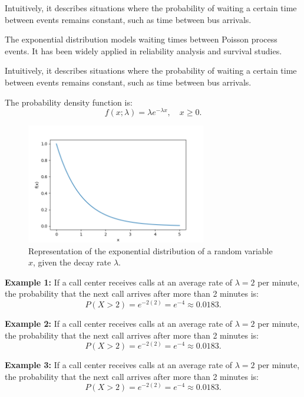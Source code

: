 \documentclass{book}
\begin{document}
Intuitively, it describes situations where the probability of waiting a certain time between events remains constant, such as time between bus arrivals.

The exponential distribution models waiting times between Poisson process events. It has been widely applied in reliability analysis and survival studies.

Intuitively, it describes situations where the probability of waiting a certain time between events remains constant, such as time between bus arrivals.

The probability density function is:
\begin{equation}
    f(x; \lambda) = \lambda e^{-\lambda x}, \quad x \geq 0.
\end{equation}

\begin{figure}[ht]
    \centering
    \includegraphics[width=0.7\textwidth]{figures/chapter2/exponential.png}
    \caption{Representation of the exponential distribution of a random variable $x$, given the decay rate $\lambda$.}
    \label{fig:random}
\end{figure}

\textbf{Example 1:} If a call center receives calls at an average rate of $\lambda = 2$ per minute, the probability that the next call arrives after more than 2 minutes is:
\begin{equation}
    P(X > 2) = e^{-2(2)} = e^{-4} \approx 0.0183.
\end{equation}

\textbf{Example 2:} If a call center receives calls at an average rate of $\lambda = 2$ per minute, the probability that the next call arrives after more than 2 minutes is:
\begin{equation}
    P(X > 2) = e^{-2(2)} = e^{-4} \approx 0.0183.
\end{equation}

\textbf{Example 3:} If a call center receives calls at an average rate of $\lambda = 2$ per minute, the probability that the next call arrives after more than 2 minutes is:
\begin{equation}
    P(X > 2) = e^{-2(2)} = e^{-4} \approx 0.0183.
\end{equation}
\end{document}
